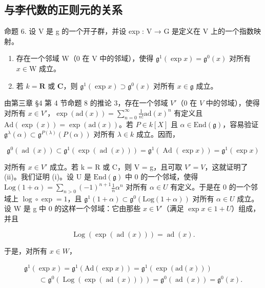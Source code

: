 \subsection{与李代数的正则元的关系}

命题 6. 设 V 是 g 的一个开子群，并设 exp : V → G 是定义在 V 上的一个指数映射。

\begin{enumerate}
\def\labelenumi{(\roman{enumi})}
\item
  存在一个邻域 \(\mathrm{W}\)（0 在 \(\mathrm{V}\) 中的邻域），使得 \(\mathfrak{g}^1(\exp x) = \mathfrak{g}^0(x)\) 对所有 \(x \in \mathrm{W}\) 成立。
\item
  若 \(k = \mathbf{R}\) 或 \(\mathbf{C}\)，则 \(\mathfrak{g}^1(\exp x) \supset \mathfrak{g}^0(x)\) 对所有 \(x \in \mathfrak{g}\) 成立。
\end{enumerate}

由第三章 §4 第 4 节命题 8 的推论 3，存在一个邻域 \(V'\)（0 在 \(V\) 中的邻域），使得对所有 \(x \in V'\)，\(\exp(\mathrm{ad}(x)) = \sum_{n=0}^{\infty} \frac{1}{n!} \mathrm{ad}(x)^n\) 有定义且 \(\mathrm{Ad}(\exp(x)) = \exp(\mathrm{ad}(x))\)。若 \(P \in k[X]\) 且 \(\alpha \in \mathrm{End}(\mathfrak{g})\)，容易验证 \(\mathfrak{g}^\lambda(\alpha) \subset \mathfrak{g}^{P(\lambda)}(P(\alpha))\) 对所有 \(\lambda \in k\) 成立。因而，

\[
\mathfrak {g} ^ {0} (\operatorname{ad} (x)) \subset \mathfrak {g} ^ {1} (\exp (\operatorname{ad} (x))) = \mathfrak {g} ^ {1} (\operatorname{Ad} (\exp x)) = \mathfrak {g} ^ {1} (\exp x)
\]

对所有 \(x \in V'\) 成立。若 k = R 或 C，则 V = g，且可取 \(V' = V\)，这就证明了 (ii)。我们证明 (i)。设 U 是 \(\text{End}(\mathfrak{g})\) 中 0 的一个邻域，使得 \(\text{Log}(1 + \alpha) = \sum_{n > 0} (-1)^{n+1} \frac{1}{n} \alpha^n\) 对所有 \(\alpha \in U\) 有定义。于是在 0 的一个邻域上 \(\log \circ \exp = 1\)，且 \(\mathfrak{g}^1(1 + \alpha) \subset \mathfrak{g}^0 (\text{Log}(1 + \alpha))\) 对所有 \(\alpha \in U\) 成立。设 W 是 g 中 0 的这样一个邻域：它由那些 \(x \in V'\)（满足 \(\exp x \in 1 + U\)）组成，并且

\[
\operatorname{Log} (\exp (\operatorname{ad} (x))) = \operatorname{ad} (x).
\]

于是，对所有 \(x \in W\)，

\[
\begin{array}{c} \mathfrak {g} ^ {1} (\exp x) = \mathfrak {g} ^ {1} (\mathrm{Ad} (\exp x)) = \mathfrak {g} ^ {1} (\exp (\mathrm{ad} (x))) \\ \qquad \subset \mathfrak {g} ^ {0} (\operatorname{Log} (\exp (\operatorname{ad} (x)))) = \mathfrak {g} ^ {0} (\operatorname{ad} (x)) = \mathfrak {g} ^ {0} (x). \end{array}
\]

